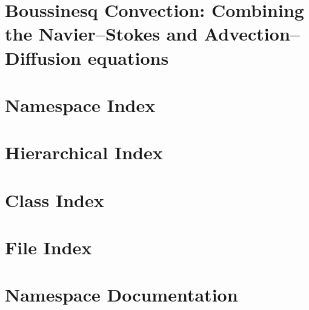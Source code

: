 \let\mypdfximage\pdfximage\def\pdfximage{\immediate\mypdfximage}\documentclass[twoside]{book}
\newcommand{\+}{\discretionary{\mbox{\scriptsize$\hookleftarrow$}}{}{}}
\begin{document}
\hypersetup{pageanchor=false,
             bookmarksnumbered=true
            }
\hypersetup{pageanchor=true}

\chapter{Boussinesq Convection\+: Combining the Navier--Stokes and Advection--Diffusion equations}
\label{index}\hypertarget{index}{}
\chapter{Namespace Index}

\chapter{Hierarchical Index}

\chapter{Class Index}

\chapter{File Index}

\chapter{Namespace Documentation}




\end{document}
